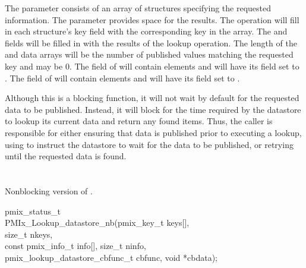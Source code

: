 The  parameter consists of an array of  structures specifying the requested information.
The  parameter provides space for the results.  The operation will fill in each 
 structure's key field with the corresponding key in the  array. 
The  and  fields will be filled in with the results of the lookup operation.
The length of the  and  data arrays will be the number of published values matching the requested
key and may be 0.  The  field of  will contain  elements and will have its  field set to .
The  field of  will contain  elements 
and will have its  field set to .

\adviceuserstart
Although this is a blocking function, it will not wait by default for the requested data to be published.
Instead, it will block for the time required by the datastore to lookup its current data and return any found items.
Thus, the caller is responsible for either ensuring that data is published prior to executing a lookup, using  to instruct the datastore to wait for the data to be published, or retrying until the requested data is found.
\adviceuserend


\section{}

\summary

Nonblocking version of .

\format

\cspecificstart
\begin{codepar}
pmix_status_t \\
PMIx_Lookup_datastore_nb(pmix_key_t keys[], \\
\hspace*{15\sigspace}size_t nkeys, \\
\hspace*{15\sigspace}const pmix_info_t info[], size_t ninfo, \\
\hspace*{15\sigspace}pmix_lookup_datastore_cbfunc_t cbfunc, void *cbdata);
\end{codepar}
\cspecificend

